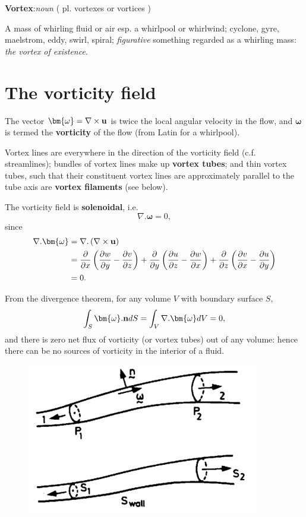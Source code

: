 \documentclass[10pt]{report}
\begin{document}
\textbf{Vortex}:\textit{noun} ( pl. vortexes or vortices )

A mass of whirling fluid or air esp. a whirlpool or whirlwind; cyclone, gyre,
maelstrom, eddy, swirl, spiral; \textit{figurative} something regarded as a whirling mass: \textit{the vortex of existence}.

\section{The vorticity field}


The vector ${\bm{\omega}} =\nabla \times {{\bf u}}$ is twice the local angular
velocity in the flow, and ${\bm \omega}$ is termed the
\textbf{vorticity} of the flow (from Latin for a whirlpool).

Vortex lines are everywhere in the direction of the vorticity field (c.f.
streamlines); bundles of vortex lines make up \textbf{vortex tubes}; and
thin vortex tubes, such that their constituent vortex lines are
approximately parallel to the tube axis are \textbf{vortex filaments} (see
below).

The vorticity field is \textbf{solenoidal},  i.e.
\[ \nabla . {\bm{\omega}} = 0,\]
since
\begin{align*}
\nabla . {\bm{\omega}}
& =\nabla . \left( {\nabla \times {{\bf u}}}
\right) \\
& =\frac{\partial }{\partial x}\left( {\frac{\partial w}{\partial
y}-\frac{\partial v}{\partial z}} \right)+\frac{\partial }{\partial y}\left(
{\frac{\partial u}{\partial z}-\frac{\partial w}{\partial x}}
\right)+\frac{\partial }{\partial z}\left( {\frac{\partial v}{\partial
x}-\frac{\partial u}{\partial y}} \right) \\
& = 0.
\end{align*}

From the divergence theorem, for any volume $V$ with boundary surface $S$,
\[
\int_S {{\bm{\omega}}. {{\bf n}}dS} =\int_V {\nabla . {\bm{\omega}} dV}
=0,
\]
and there is zero net flux of vorticity (or vortex tubes) out of any volume:
hence there can be no sources of vorticity in the interior of a fluid.

\begin{figure}[htbp]
\centerline{\includegraphics[width=4in]{Section42.pdf}}
\caption{ }
\label{fig3.2}
\end{figure}
\end{document}
